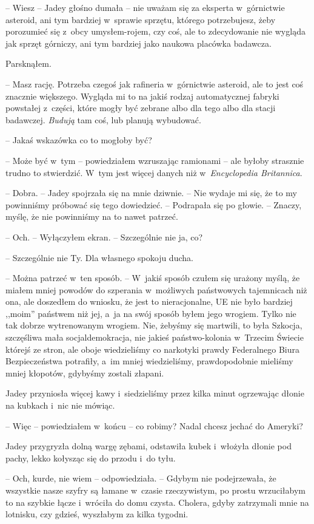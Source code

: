 \documentclass[oneside,polish,12pt,sfheadings]{mwbk}
\begin{document}
-- Wiesz -- Jadey głośno dumała -- nie uważam się za eksperta w~górnictwie
asteroid, ani tym bardziej w~sprawie sprzętu, którego potrzebujesz, żeby
porozumieć się z~obcy umysłem-rojem, czy coś, ale to zdecydowanie nie
wygląda jak sprzęt górniczy, ani tym bardziej jako naukowa placówka
badawcza.

Parsknąłem. 

-- Masz rację. Potrzeba czegoś jak rafineria w~górnictwie
asteroid, ale to jest coś znacznie większego. Wygląda mi to na jakiś
rodzaj automatycznej fabryki powstałej z~części, które mogły być zebrane
albo dla tego albo dla stacji badawczej. \emph{Budują} tam coś, lub
planują wybudować.

-- Jakaś wskazówka co to mogłoby być?

-- Może być w~tym -- powiedziałem wzruszając ramionami -- ale byłoby
strasznie trudno to stwierdzić. W~tym jest więcej danych niż w~\emph{Encyclopedia Britannica}.

-- Dobra. -- Jadey spojrzała się na mnie dziwnie. -- Nie wydaje mi się, że
to my powinniśmy próbować się tego dowiedzieć. -- Podrapała się po
głowie. -- Znaczy, myślę, że nie powinniśmy na to nawet patrzeć.

-- Och. -- Wyłączyłem ekran. -- Szczególnie nie ja, co?

-- Szczególnie nie Ty. Dla własnego spokoju ducha.

-- Można patrzeć w~ten sposób. -- W~jakiś sposób czułem się urażony myślą,
że miałem mniej powodów do szperania w~możliwych państwowych tajemnicach
niż ona, ale doszedłem do wniosku, że jest to nieracjonalne, UE nie
było bardziej ,,moim'' państwem niż jej, a~ja na swój sposób byłem jego
wrogiem. Tylko nie tak dobrze wytrenowanym wrogiem. Nie, żebyśmy się
martwili, to była Szkocja, szczęśliwa mała socjaldemokracja, nie jakieś
państwo-kolonia w~Trzecim Świecie którejś ze stron, ale oboje
wiedzieliśmy co narkotyki prawdy Federalnego Biura Bezpieczeństwa
potrafiły, a~im mniej wiedzieliśmy, prawdopodobnie mieliśmy mniej
kłopotów, gdybyśmy zostali złapani.

Jadey przyniosła więcej kawy i~siedzieliśmy przez kilka minut ogrzewając
dłonie na kubkach i~nic nie mówiąc.

-- Więc -- powiedziałem w~końcu -- co robimy? Nadal chcesz jechać do
Ameryki?

Jadey przygryzła dolną wargę zębami, odstawiła kubek i~włożyła dłonie
pod pachy, lekko kołysząc się do przodu i~do tyłu. 

-- Och, kurde, nie wiem -- odpowiedziała. -- Gdybym nie podejrzewała, że wszystkie nasze szyfry są łamane w~czasie rzeczywistym, po prostu wrzuciłabym to na
szybkie łącze i~wróciła do domu czysta. Cholera, gdyby zatrzymali mnie
na lotnisku, czy gdzieś, wyszłabym za kilka tygodni.
\end{document}
